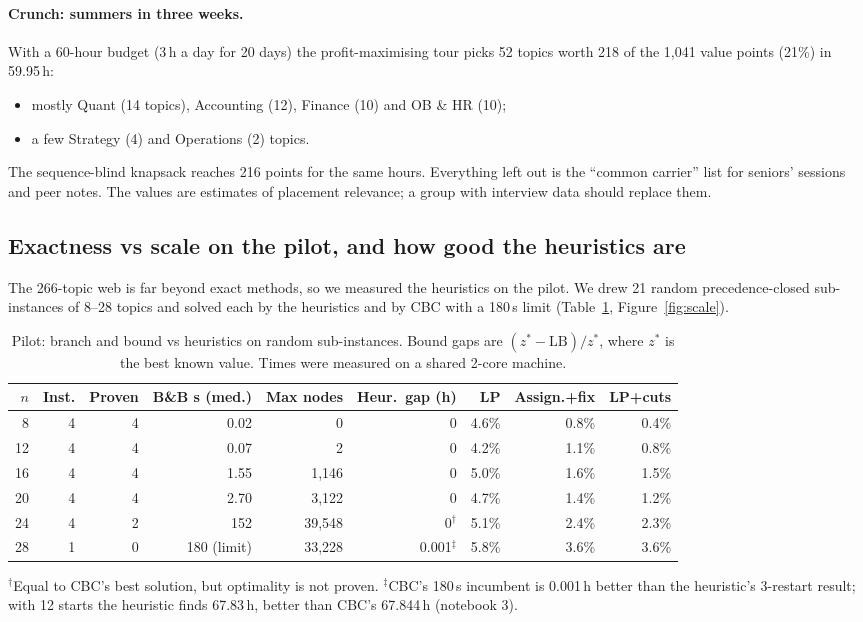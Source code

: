 \documentclass[11pt,a4paper]{article}
\begin{document}
\paragraph{Crunch: summers in three weeks.} With a 60-hour budget (3\,h a day for 20 days) the profit-maximising tour picks 52 topics worth 218 of the 1{,}041 value points (21\%) in 59.95\,h:
\begin{itemize}
\item mostly Quant (14 topics), Accounting (12), Finance (10) and OB \& HR (10);
\item a few Strategy (4) and Operations (2) topics.
\end{itemize}
The sequence-blind knapsack reaches 216 points for the same hours. Everything left out is the ``common carrier'' list for seniors' sessions and peer notes. The values are estimates of placement relevance; a group with interview data should replace them.

\subsection{Exactness vs scale on the pilot, and how good the heuristics are}
The 266-topic web is far beyond exact methods, so we measured the heuristics on the pilot. We drew 21 random precedence-closed sub-instances of 8--28 topics and solved each by the heuristics and by CBC with a 180\,s limit (Table~\ref{tab:scale}, Figure~\ref{fig:scale}).

\begin{table}[H]\centering\small
\caption{Pilot: branch and bound vs heuristics on random sub-instances. Bound gaps are $(z^*-\text{LB})/z^*$, where $z^*$ is the best known value. Times were measured on a shared 2-core machine.}
\label{tab:scale}
\setlength{\tabcolsep}{4.5pt}
\begin{tabular}{@{}rrrrrrrrr@{}}
\toprule
$n$ & Inst. & Proven & B\&B s (med.) & Max nodes & Heur.\ gap (h) & LP & Assign.+fix & LP+cuts\\
\midrule
8 & 4 & 4 & 0.02 & 0 & 0 & 4.6\% & 0.8\% & 0.4\%\\
12 & 4 & 4 & 0.07 & 2 & 0 & 4.2\% & 1.1\% & 0.8\%\\
16 & 4 & 4 & 1.55 & 1{,}146 & 0 & 5.0\% & 1.6\% & 1.5\%\\
20 & 4 & 4 & 2.70 & 3{,}122 & 0 & 4.7\% & 1.4\% & 1.2\%\\
24 & 4 & 2 & 152 & 39{,}548 & 0$^\dagger$ & 5.1\% & 2.4\% & 2.3\%\\
28 & 1 & 0 & 180 (limit) & 33{,}228 & 0.001$^\ddagger$ & 5.8\% & 3.6\% & 3.6\%\\
\bottomrule
\end{tabular}\par\smallskip
{\footnotesize $^\dagger$Equal to CBC's best solution, but optimality is not proven. $^\ddagger$CBC's 180\,s incumbent is 0.001\,h better than the heuristic's 3-restart result; with 12 starts the heuristic finds 67.83\,h, better than CBC's 67.844\,h (notebook 3).}
\end{table}
\end{document}
